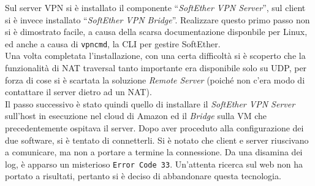 Sul server VPN si è installato il componente ``\textit{SoftEther VPN Server}'', sul client si è
invece installato ``\textit{SoftEther VPN Bridge}''. Realizzare questo primo passo
non si è dimostrato facile, a causa della scarsa documentazione disponbile per Linux,
ed anche a causa di \texttt{vpncmd}, la CLI per gestire SoftEther.\\
Una volta completata l'installazione, con una certa difficoltà si è scoperto che la funzionalità
di NAT traversal tanto importante era disponibile solo su UDP, per forza di
cose si è scartata la soluzione \textit{Remote Server} (poiché non c'era modo di contattare
il server dietro ad un NAT).\\
Il passo successivo è stato quindi quello di installare il \textit{SoftEther VPN Server}
sull'host in esecuzione nel cloud di Amazon ed il \textit{Bridge} sulla VM che precedentemente
ospitava il server. Dopo aver proceduto alla configurazione dei due software, si è tentato
di connetterli. Si è notato che client e server riuscivano a comunicare, ma non a portare
a termine la connessione. Da una disamina dei log, è apparso un misterioso \texttt{Error Code 33}.
Un'attenta ricerca sul web non ha portato a risultati, pertanto si è deciso di abbandonare
questa tecnologia.
